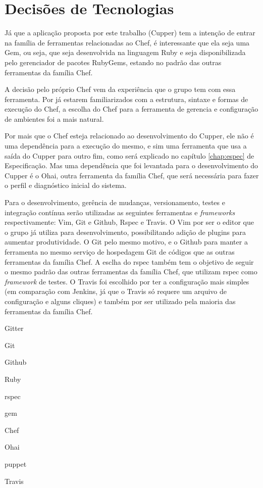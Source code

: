 \section{Decisões de Tecnologias}

Já que a aplicação proposta por este trabalho (Cupper) tem a intenção de entrar na família de ferramentas relacionadas ao Chef, é interessante que ela seja uma Gem, ou seja, que seja desenvolvida na linguagem Ruby e seja disponibilizada pelo gerenciador de pacotes RubyGems, estando no padrão das outras ferramentas da família Chef.

A decisão pelo próprio Chef vem da experiência que o grupo tem com essa ferramenta. Por já estarem familiarizados com a estrutura, sintaxe e formas de execução do Chef, a escolha do Chef para a ferramenta de gerencia e configuração de ambientes foi a mais natural.

Por mais que o Chef esteja relacionado ao desenvolvimento do Cupper, ele não é uma dependência para a execução do mesmo, e sim uma ferramenta que usa a saída do Cupper para outro fim, como será explicado no capítulo \ref{chap:espec} de Especificação. Mas uma dependência que foi levantada para o desenvolvimento do Cupper é o Ohai, outra ferramenta da família Chef, que será necessária para fazer o perfil e diagnóstico inicial do sistema.

Para o desenvolvimento, gerência de mudanças, versionamento, testes e integração contínua serão utilizadas as seguintes ferramentas e \textit{frameworks} respectivamente: Vim, Git e Github, Rspec e Travis. O Vim por ser o editor que o grupo já utiliza para desenvolvimento, possibilitando adição de plugins para aumentar produtividade. O Git pelo mesmo motivo, e o Github para manter a ferramenta no mesmo serviço de hospedagem Git de códigos que as outras ferramentas da família Chef. A esclha do rspec também tem o objetivo de seguir o mesmo padrão das outras ferramentas da família Chef, que utilizam rspec como \textit{framework} de testes. O Travis foi escolhido por ter a configuração mais simples (em comparação com Jenkins, já que o Travis só requere um arquivo de configuração e alguns cliques) e também por ser utilizado pela maioria das ferramentas da família Chef.



Gitter

Git

Github

Ruby

rspec

gem

Chef

Ohai

puppet

Travis

